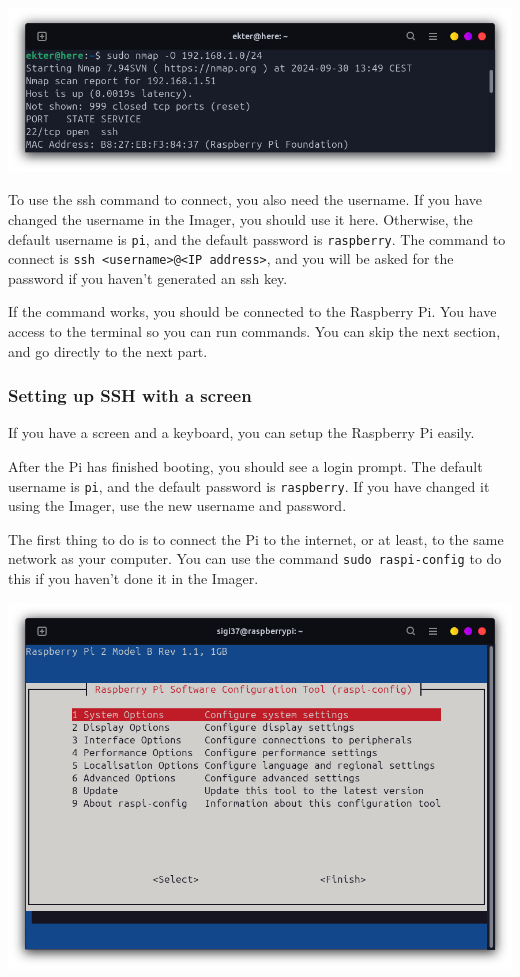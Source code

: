 \documentclass{article}
\begin{document}
\includegraphics[scale=0.37]{img/nmap_O.png}

To use the ssh command to connect, you also need the username. If you have changed the username in
the Imager, you should use it here. Otherwise, the default username is \texttt{pi}, and the default
password is \texttt{raspberry}. The command to connect is \texttt{ssh <username>@<IP address>}, and
you will be asked for the password if you haven't generated an ssh key.

If the command works, you should be connected to the Raspberry Pi. You have access to the terminal
so you can run commands.
You can skip the next section, and go directly to the next part.

\subsubsection{Setting up SSH with a screen}

If you have a screen and a keyboard, you can setup the Raspberry Pi easily.

After the Pi has finished booting, you should see a login prompt. The default username is
\texttt{pi}, and the default password is \texttt{raspberry}. If you have changed it using the
Imager, use the new username and password.

The first thing to do is to connect the Pi to the internet, or at least, to the same network as
your computer. You can use the command \texttt{sudo raspi-config} to do this if you haven't done
it in the Imager.

\includegraphics[scale=0.37]{img/raspi_config_home.png}
\end{document}
